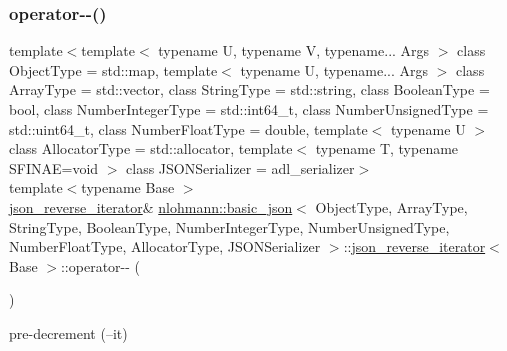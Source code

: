 \subsubsection{\texorpdfstring{operator-\/-\/()}{operator--()}\hspace{0.1cm}{\footnotesize\ttfamily [2/2]}}
{\footnotesize\ttfamily template$<$template$<$ typename U, typename V, typename... Args $>$ class Object\+Type = std\+::map, template$<$ typename U, typename... Args $>$ class Array\+Type = std\+::vector, class String\+Type  = std\+::string, class Boolean\+Type  = bool, class Number\+Integer\+Type  = std\+::int64\+\_\+t, class Number\+Unsigned\+Type  = std\+::uint64\+\_\+t, class Number\+Float\+Type  = double, template$<$ typename U $>$ class Allocator\+Type = std\+::allocator, template$<$ typename T, typename S\+F\+I\+N\+A\+E=void $>$ class J\+S\+O\+N\+Serializer = adl\+\_\+serializer$>$ \\
template$<$typename Base $>$ \\
\mbox{\hyperlink{classnlohmann_1_1basic__json_1_1json__reverse__iterator}{json\+\_\+reverse\+\_\+iterator}}\& \mbox{\hyperlink{classnlohmann_1_1basic__json}{nlohmann\+::basic\+\_\+json}}$<$ Object\+Type, Array\+Type, String\+Type, Boolean\+Type, Number\+Integer\+Type, Number\+Unsigned\+Type, Number\+Float\+Type, Allocator\+Type, J\+S\+O\+N\+Serializer $>$\+::\mbox{\hyperlink{classnlohmann_1_1basic__json_1_1json__reverse__iterator}{json\+\_\+reverse\+\_\+iterator}}$<$ Base $>$\+::operator-\/-\/ (\begin{DoxyParamCaption}{ }\end{DoxyParamCaption})\hspace{0.3cm}{\ttfamily [inline]}}



pre-\/decrement (--it) 

\mbox{\label{classnlohmann_1_1basic__json_1_1json__reverse__iterator_af4879af64a0f24bd308b13b859808f84}} 
